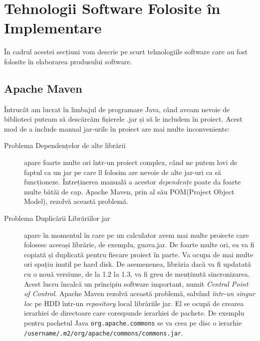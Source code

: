 
\section{Tehnologii Software Folosite în Implementare}

În cadrul acestei secțiuni vom descrie pe scurt tehnologiile software care au fost folosite în elaborarea produsului software.

\subsection{Apache Maven}


Întrucât am lucrat în limbajul de programare Java, când aveam nevoie de biblioteci puteam să descărcăm fișierele .jar și să le includem în proiect. Acest mod de a include manual jar-urile în proiect are mai multe inconveniente:


\begin{description}
\item[Problema Dependențelor de alte librării] apare foarte multe ori într-un proiect complex, când ne putem lovi de faptul ca un jar pe care îl folosim are nevoie de alte jar-uri ca să funcționeze. Întreținerea manuală a acestor \textit{dependențe} poate da foarte multe bătăi de cap. Apache Maven, prin al său POM(Project Object Model), rezolvă această problemă.

\item[Problema Duplicării Librăriilor jar] apare în momentul în care pe un calculator avem mai multe proiecte care folosesc aceeași librărie, de exemplu, guava.jar. De foarte multe ori, ea va fi copiată și duplicată pentru fiecare proiect în parte. Va ocupa de mai multe ori spațiu inutil pe hard disk. De asemenenea, librăria dacă va fi updatată cu o nouă versiune, de la 1.2 la 1.3, va fi greu de menținută sincronizarea. Acest lucru încalcă un principiu software important, numit \textit{Central Point of Control}. Apache Maven rezolvă această problemă, salvând \textit{într-un singur loc} pe HDD într-un \textit{repository} local librăriile jar. El se ocupă de crearea ierarhiei de directoare care corespunde ierarhiei de pachete. De exemplu pentru pachetul Java \texttt{org.apache.commons} se va crea pe disc o ierarhie \texttt{/username/.m2/org/apache/commons/commons.jar}.
\end{description}

